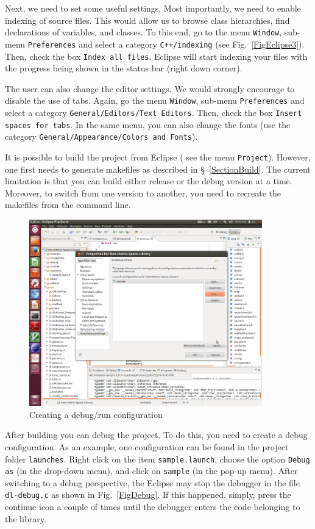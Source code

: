 \documentclass[runningheads,a4paper]{llncs}
\newcommand{\ttt}[1]{\texttt{#1}}
\begin{document}
{Next, we need to set some useful settings.
Most importantly, we need to enable indexing of source files.
This would allow us to browse class hierarchies, find declarations
of variables, and classes.
To this end, go to the menu \ttt{Window}, sub-menu \ttt{Preferences}
and select a category \ttt{C++/indexing} (see Fig.~\ref{FigEclipse3}).
Then, check the box \ttt{Index all files}.
Eclipse will start indexing your files 
with the progress being shown in the status bar (right down corner).

The user can also change the editor settings. 
We would strongly encourage to disable the use of tabs.
Again, go the menu \ttt{Window}, sub-menu \ttt{Preferences}
and select a category \ttt{General/Editors/Text Editors}.
Then, check the box \ttt{Insert spaces for tabs}.
In the same menu, you can also change the fonts (use the
category \ttt{General/Appearance/Colors and Fonts}).

It is possible to build the project from Eclipse (
see the menu \texttt{Project}).
However, one first needs to generate makefiles as described in \S~\ref{SectionBuild}.
The current limitation is that you can build either release
or the debug version at a time.
Moreover, to switch from one version to another, you need to recreate
the makefiles from the command line.

\begin{figure}
\caption{\label{FigDebugConf}Creating a debug/run configuration}
\includegraphics[width=0.9\textwidth]{figures/EclipseDebugConf.pdf}
\end{figure}

After building you can debug the project.
To do this, you need to create a debug configuration.
As an example, one configuration can be found in the 
project folder \ttt{launches}.
Right click on the item \ttt{sample.launch},
choose the option \ttt{Debug as} (in the drop-down menu),
and click on \ttt{sample} (in the pop-up menu).
After switching to a debug perspective,
the Eclipse may stop the debugger in 
the file \ttt{dl-debug.c} as shown in Fig.~\ref{FigDebug}.
If this happened, simply, press the continue icon a couple of
times until the debugger enters the code belonging to the library.

}
\end{document}
